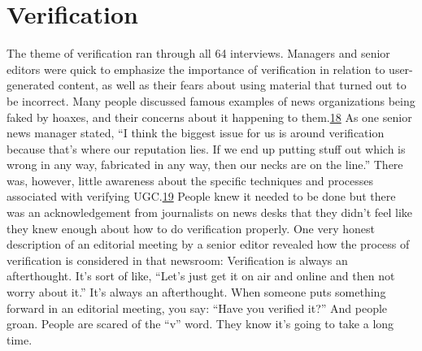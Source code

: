 \documentclass[symmetric, notoc, nobib]{towcenter-book}
\begin{document}
\chapter{Verification}
The theme of verification ran through all 64 interviews. Managers and
senior editors were quick to emphasize the importance of verification in
relation to user-generated content, as well as their fears about using material
that turned out to be incorrect. Many people discussed famous examples
of news organizations being faked by hoaxes, and their concerns about
it happening to them.{\href{#endnotes}{18}} As one senior news manager stated, ``I think the biggest
issue for us is around verification because that's where our reputation
lies. If we end up putting stuff out which is wrong in any way, fabricated in
any way, then our necks are on the line.''
There was, however, little awareness about the specific techniques and processes
associated with verifying UGC.{\href{#endnotes}{19}} People knew it needed to be done
but there was an acknowledgement from journalists on news desks that
they didn't feel like they knew enough about how to do verification properly.
One very honest description of an editorial meeting by a senior editor
revealed how the process of verification is considered in that newsroom:
Verification is always an afterthought. It's sort of like, ``Let's just get
it on air and online and then not worry about it.'' It's always an afterthought.
When someone puts something forward in an editorial
meeting, you say: ``Have you verified it?'' And people groan. People
are scared of the ``v'' word. They know it's going to take a long time.
\end{document}
